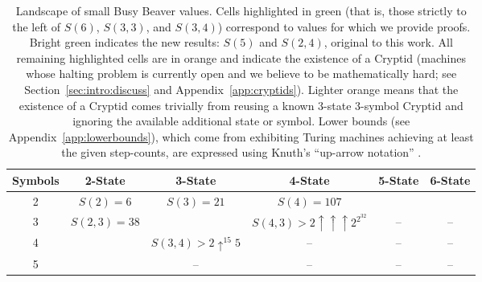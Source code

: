 \documentclass[letterpaper,british,11pt]{article}
\theoremstyle{definition} %
\numberwithin{equation}{section}
\theoremstyle{definition} %
\newcommand{\BBtheFifth}{47{,}176{,}870}
\newcommand{\BBTxF}{3{,}932{,}964}
\begin{document}
\setlength{\fboxrule}{1.2pt}
\begin{table}[h]
    \centering
    \small
    \renewcommand{\arraystretch}{1.3}
    \setlength{\tabcolsep}{5pt}  %
    \begin{tabular}{c|ccccc}
        \hline
        \textbf{Symbols} & \textbf{2-State}                                                           & \textbf{3-State} & \textbf{4-State} & \textbf{5-State} & \textbf{6-State} \\
        \hline
        2                & \cellcolor{green!20}$S(2) = 6$ \cite{Rado_1962}
                         & \cellcolor{green!20}$S(3) = 21$ \cite{Lin1963}
                         & \cellcolor{green!20}$S(4) = 107$ \cite{Brady83}
                         & \cellcolor{green!50}{$S(5) = \BBtheFifth$}
                         & \cellcolor{orange!50}{$S(6) > 2 \uparrow \uparrow \uparrow 5$}                                                                                         \\
        \hline
        3                & \cellcolor{green!20}$S(2,3) = 38$ \cite{LafittePapazian2007}
                         & \cellcolor{orange!50}{$S(3,3) > 10^{17}$}
                         & \cellcolor{orange!20}$S(4,3) > 2 \uparrow \uparrow \uparrow 2^{2^{{32}}} $
                         & --                                                                         & --                                                                        \\
        \hline
        4                & \cellcolor{green!50}{$S(2,4) = \BBTxF$}
                         & \cellcolor{orange!20}$S(3,4) > 2 \uparrow^{15} 5 $
                         & --                                                                         & --               & --                                                     \\
        \hline
        5                & \cellcolor{orange!50}{$S(2,5) > 10 \uparrow \uparrow 4$}
                         & --                                                                         & --               & --               & --                                  \\
        \hline
    \end{tabular}
    \caption{Landscape of small Busy Beaver values.
        Cells highlighted in green (that is, those strictly to the left of $S(6)$, $S(3,3)$, and $S(3,4)$) correspond to values for which we provide \Coq proofs. Bright green indicates the new results: $S(5)$ and $S(2,4)$, original to this work.
        All remaining highlighted cells are in orange and indicate the existence of a Cryptid (\ie machines whose halting problem is currently open and we believe to be mathematically hard; see Section~\ref{sec:intro:discuss} and Appendix~\ref{app:cryptids}). Lighter orange means that the existence of a Cryptid comes trivially from reusing a known 3-state 3-symbol Cryptid and ignoring the available additional state or symbol. Lower bounds (see Appendix~\ref{app:lowerbounds}), which come from exhibiting Turing machines achieving at least the given step-counts, are expressed using Knuth's ``up-arrow notation'' \cite{Knuth1976Coping}.
    }
    \label{table:landscape}
\end{table}
\end{document}
